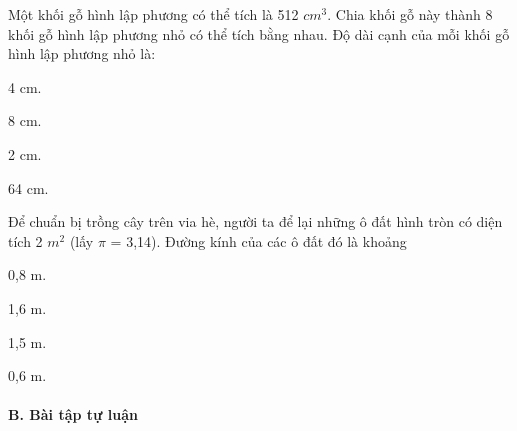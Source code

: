 \documentclass[%
    fontsize=12pt,%
    chapterprefix=false,%
    open=right,%
    twoside=false,%
    numbers=noenddot,%
    headings=optiontohead,%
    final,%
    DIV=15,%
    parskip=half %
]{scrbook}
\begin{document}
\begin{tracnghiem}
\item Một khối gỗ hình lập phương có thể tích là 512 $cm^3$. Chia khối gỗ này thành 8 khối gỗ hình lập phương nhỏ có thể tích bằng nhau. Độ dài cạnh của mỗi khối gỗ hình lập phương nhỏ là:
\begin{options}
  \item 4 cm.
  \item 8 cm.
  \item 2 cm.
  \item 64 cm.
\end{options}

\item Để chuẩn bị trồng cây trên via hè, người ta để lại những ô đất hình tròn có diện tích 2 $m^2$ (lấy $\pi$ = 3,14). Đường kính của các ô đất đó là khoảng
\begin{options}
  \item 0,8 m.
  \item 1,6 m.
  \item 1,5 m.
  \item 0,6 m.
\end{options}

\end{tracnghiem}

\paragraph{B. Bài tập tự luận}
\end{document}

